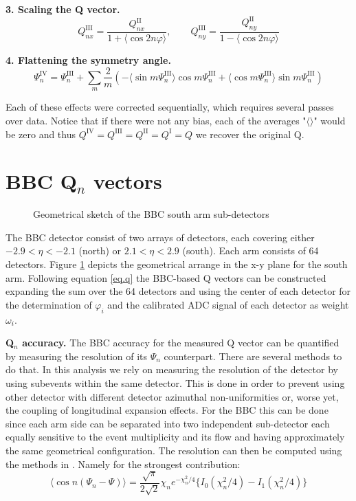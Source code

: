 \documentclass{article}
\begin{document}
{\bf 3. Scaling the Q vector.}
\begin{equation}
Q^\mathrm{III}_{nx} = \frac{Q^\mathrm{II}_{nx}}{1+\langle\cos{2n\varphi}\rangle}, \qquad
Q^\mathrm{III}_{ny} = \frac{Q^\mathrm{II}_{ny}}{1-\langle\cos{2n\varphi}\rangle}
\end{equation}

{\bf 4. Flattening the symmetry angle.}
\begin{equation}
\Psi^\mathrm{IV}_{n} = \Psi^\mathrm{III}_{n} + \sum_{m}\frac{2}{m}( -\langle\sin{m\Psi^\mathrm{III}_n}\rangle\cos{m\Psi^\mathrm{III}_n} +\langle\cos{m\Psi^\mathrm{III}_n}\rangle\sin{m\Psi^\mathrm{III}_n})
\end{equation}

Each of these effects were corrected sequentially, which requires several passes over data. Notice that if there were not any bias, each of the averages "$\langle\rangle$" would be zero and thus $Q^\mathrm{IV}=Q^\mathrm{III}=Q^\mathrm{II}=Q^\mathrm{I}=Q$ we recover the original Q.

\section{BBC Q$_n$ vectors}
\begin{figure}
\label{fig.bbcgeo}
\caption{Geometrical sketch of the BBC south arm sub-detectors}
\end{figure}
The BBC detector consist of two arrays of detectors, each covering either $-2.9<\eta<-2.1$ (north) or $2.1<\eta<2.9$ (south).
Each arm consists of 64 detectors. Figure \ref{fig.bbcgeo} depicts the geometrical arrange in the x-y plane for the south arm.
Following equation \ref{eq.q} the BBC-based Q vectors can be constructed expanding the sum over the 64 detectors and using the center of each detector for the determination of $\varphi_i$ and the calibrated ADC signal of each detector as weight $\omega_i$.

{\bf Q$_n$ accuracy.}
The BBC accuracy for the measured Q vector can be quantified by measuring the resolution of its $\Psi_n$ counterpart.
There are several methods to do that. In this analysis we rely on measuring the resolution of the detector by using subevents within the same detector. This is done in order to prevent using other detector with different detector azimuthal non-uniformities or, worse yet, the coupling of longitudinal expansion effects.
For the BBC this can be done since each arm side can be separated into two independent sub-detector each equally sensitive to the event multiplicity and its flow and having approximately the same geometrical configuration.
The resolution can then be computed using the methods in \cite{PhysRevC.77.034904}. Namely for the strongest contribution:
\begin{equation}
\langle\cos{n(\Psi_n-\Psi)}\rangle = \frac{\sqrt{\pi}}{2\sqrt{2}}\chi_n e^{-\chi_n^2/4}\lbrace I_0(\chi_n^2/4)-I_1(\chi_n^2/4)\rbrace
\end{equation}
\end{document}
